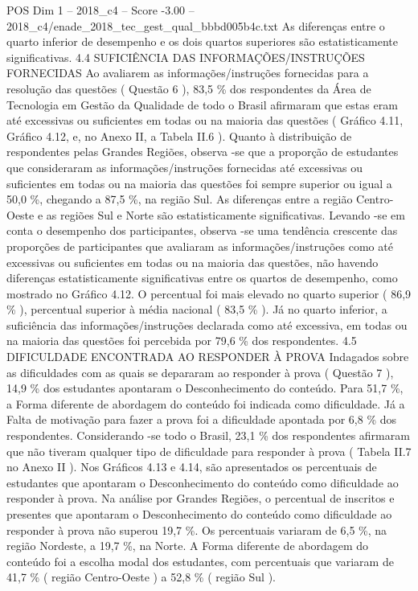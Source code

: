\begin{textsample}{POS Dim 1 – 2018\_c4 – Score -3.00 – 2018\_c4/enade\_2018\_tec\_gest\_qual\_bbbd005b4c.txt}
As diferenças entre o quarto inferior de desempenho e os dois quartos superiores são estatisticamente significativas. 4.4 SUFICIÊNCIA DAS INFORMAÇÕES/INSTRUÇÕES FORNECIDAS Ao avaliarem as informações/instruções fornecidas para a resolução das questões ( Questão 6 ), 83,5 \% dos respondentes da Área de Tecnologia em Gestão da Qualidade de todo o Brasil afirmaram que estas eram até excessivas ou suficientes em todas ou na maioria das questões ( Gráfico 4.11, Gráfico 4.12, e, no Anexo II, a Tabela II.6 ).
Quanto à distribuição de respondentes pelas Grandes Regiões, observa -se que a proporção de estudantes que consideraram as informações/instruções fornecidas até excessivas ou suficientes em todas ou na maioria das questões foi sempre superior ou igual a 50,0 \%, chegando a 87,5 \%, na região Sul.
As diferenças entre a região Centro-Oeste e as regiões Sul e Norte são estatisticamente significativas.
Levando -se em conta o desempenho dos participantes, observa -se uma tendência crescente das proporções de participantes que avaliaram as informações/instruções como até excessivas ou suficientes em todas ou na maioria das questões, não havendo diferenças estatisticamente significativas entre os quartos de desempenho, como mostrado no Gráfico 4.12.
O percentual foi mais elevado no quarto superior ( 86,9 \% ), percentual superior à média nacional ( 83,5 \% ).
Já no quarto inferior, a suficiência das informações/instruções declarada como até excessiva, em todas ou na maioria das questões foi percebida por 79,6 \% dos respondentes. 4.5 DIFICULDADE ENCONTRADA AO RESPONDER À PROVA Indagados sobre as dificuldades com as quais se depararam ao responder à prova ( Questão 7 ), 14,9 \% dos estudantes apontaram o Desconhecimento do conteúdo.
Para 51,7 \%, a Forma diferente de abordagem do conteúdo foi indicada como dificuldade.
Já a Falta de motivação para fazer a prova foi a dificuldade apontada por 6,8 \% dos respondentes.
Considerando -se todo o Brasil, 23,1 \% dos respondentes afirmaram que não tiveram qualquer tipo de dificuldade para responder à prova ( Tabela II.7 no Anexo II ).
Nos Gráficos 4.13 e 4.14, são apresentados os percentuais de estudantes que apontaram o Desconhecimento do conteúdo como dificuldade ao responder à prova.
Na análise por Grandes Regiões, o percentual de inscritos e presentes que apontaram o Desconhecimento do conteúdo como dificuldade ao responder à prova não superou 19,7 \%.
Os percentuais variaram de 6,5 \%, na região Nordeste, a 19,7 \%, na Norte.
A Forma diferente de abordagem do conteúdo foi a escolha modal dos estudantes, com percentuais que variaram de 41,7 \% ( região Centro-Oeste ) a 52,8 \% ( região Sul ).

\end{textsample}
